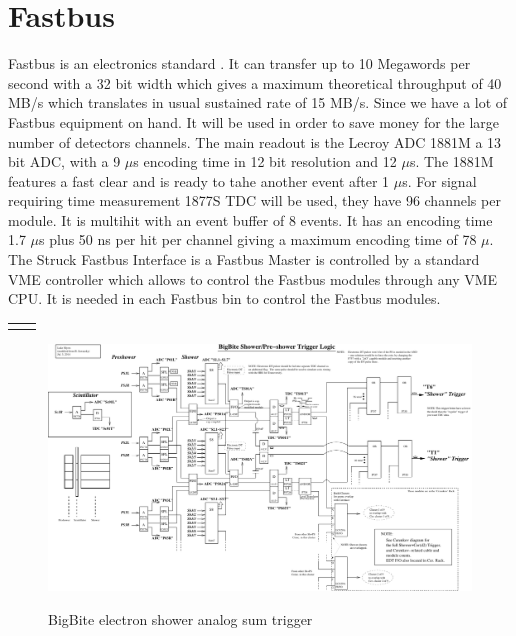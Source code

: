 \documentclass{article}
\begin{document}
\section{Fastbus}
Fastbus is an electronics standard . It can transfer up to 10 Megawords per second with a 32 bit width which gives a maximum theoretical throughput of 40 MB/s which translates in usual sustained rate of 15 MB/s.
Since we have a lot of Fastbus equipment on hand. It will be used in order to save money for the large number of detectors channels. The main readout is the Lecroy ADC 1881M a 13 bit ADC, with a 9 $\mu$s encoding time in 12 bit resolution and 12  $\mu$s. The 1881M features a fast clear and is ready to tahe another event after 1 $\mu$s. For signal requiring time measurement 1877S TDC will be used, they have 96 channels per module. It is multihit with an event buffer of 8 events. It has an encoding time  1.7 $\mu$s plus 50 ns per hit per channel giving a maximum encoding time of 78 $\mu$. 
The Struck Fastbus Interface is a Fastbus Master is controlled by a standard VME controller which allows to control the Fastbus modules through any VME CPU. It is needed in each Fastbus bin to control the Fastbus modules.

\begin{tabular}{|c|c|}
\hline
&\\
\hline
&\\
\hline
\end{tabular}






\newpage
\begin{figure}
\includegraphics[scale=0.9,angle=270]{figs/Sh-PS_logic_v2A.pdf}\\
\caption {BigBite electron shower analog sum trigger \label{BBEtrig}}
\end{figure}
\newpage
\end{document}
